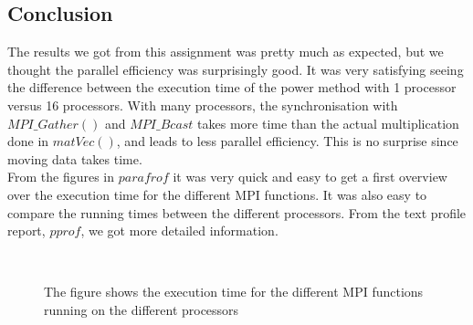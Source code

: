 \subsection*{Conclusion}
The results we got from this assignment was pretty much as expected, but we thought the parallel efficiency was surprisingly good. It was very satisfying seeing the difference between the execution time of the power method with 1 processor versus 16 processors. With many processors, the synchronisation with $MPI\_Gather()$ and $MPI\_Bcast$ takes more time than the actual multiplication done in $matVec()$, and leads to less parallel efficiency. This is no surprise since moving data takes time.\\
From the figures in $parafrof$ it was very quick and easy to get a first overview over the execution time for the different MPI functions. It was also easy to compare the running times between the different processors. From the text profile report, $pprof$, we got more detailed information.

 
\begin{figure}[h!] 
 \center 
  \\
 \caption{ The figure shows the execution time for the different MPI functions running on the different processors \label{fig:}}
 \end{figure}


\clearpage
























